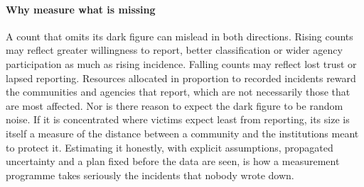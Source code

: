 \paragraph{Why measure what is missing}
A count that omits its dark figure can mislead in both directions. Rising
counts may reflect greater willingness to report, better classification or
wider agency participation as much as rising incidence. Falling counts may
reflect lost trust or lapsed reporting. Resources allocated in proportion to
recorded incidents reward the communities and agencies that report, which
are not necessarily those that are most affected. Nor is there reason to
expect the dark figure to be random noise. If it is concentrated where victims
expect least from reporting, its size is itself a measure of the distance
between a community and the institutions meant to protect it. Estimating
it honestly, with explicit assumptions, propagated uncertainty and a plan fixed before the data are
seen, is how a measurement programme takes seriously the incidents that
nobody wrote down.
